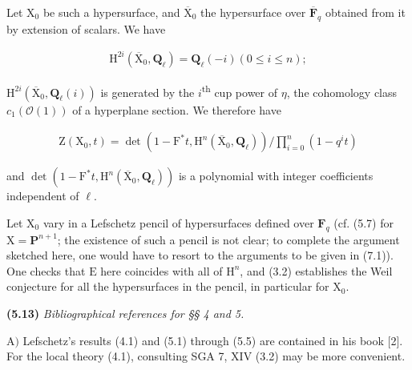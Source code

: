 \documentclass[10pt,leqno]{article}
\begin{document}
\noindent Let \(\mathrm{X}_{0}\) be such a hypersurface, and \(\overline{\mathrm{X}}_{0}\) the hypersurface over \(\overline{\mathbf{F}}_{q}\) obtained from it by extension of scalars. We have\par

\begin{equation*}\begin{gathered}\mathrm{H}^{2i}(\overline{\mathrm{X}}_{0},\mathbf{Q}_{\ell })=\mathbf{Q}_{\ell }(- i)    (0\leq i\leq n);\end{gathered}\end{equation*}

\noindent \(\mathrm{H}^{2i}(\overline{\mathrm{X}}_{0},\mathbf{Q}_{\ell }(i))\) is generated by the \(i\)\textsuperscript{th} cup power of \(\eta \), the cohomology class \(c_{1}(\mathcal{O}(1))\) of a hyperplane section. We therefore have\par

\begin{equation*}\begin{gathered}\mathrm{Z}(\mathrm{X}_{0},t)=\operatorname{det}(1- \mathrm{F}^{*}t,\mathrm{H}^{n}(\overline{\mathrm{X}}_{0},\mathbf{Q}_{\ell })) / \prod _{i=0}^{n}(1- q^{i} t)\end{gathered}\end{equation*}

\noindent and \(\operatorname{det}(1- \mathrm{F}^{*}t,\mathrm{H}^{n}(\overline{\mathrm{X}}_{0},\mathbf{Q}_{\ell }))\) is a polynomial with integer coefficients independent of \(\ell \).\par

\noindent Let \(\mathrm{X}_{0}\) vary in a Lefschetz pencil of hypersurfaces defined over \(\mathbf{F}_{q}\) (cf. (5.7) for \(\mathrm{X}=\mathbf{P}^{n+1}\); the existence of such a pencil is not clear; to complete the argument sketched here, one would have to resort to the arguments to be given in (7.1)). One checks that \(\mathrm{E}\) here coincides with all of \(\mathrm{H}^{n}\), and (3.2) establishes the Weil conjecture for all the hypersurfaces in the pencil, in particular for \(\mathrm{X}_{0}\).\par

\noindent \textbf{(5.13)} \emph{Bibliographical references for §§ 4 and 5.}\par

\noindent \(\mathrm{A})\) Lefschetz’s results (4.1) and (5.1) through (5.5) are contained in his book [2]. For the local theory (4.1), consulting SGA 7, XIV (3.2) may be more convenient.\par
\end{document}
